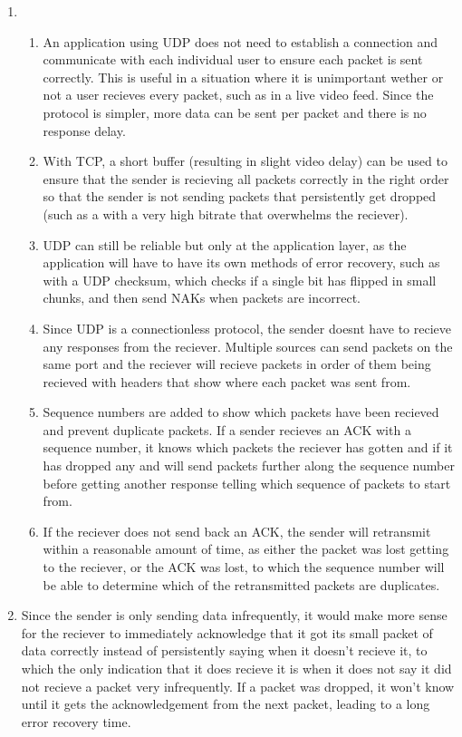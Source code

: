 \documentclass[12pt]{article}
\begin{document}
\begin{enumerate}
	\item \begin{enumerate}
			\item An application using UDP does not need to establish a connection and communicate with each individual user to ensure each packet is sent correctly. This is useful in a situation where it is unimportant wether or not a user recieves every packet, such as in a live video feed. Since the protocol is simpler, more data can be sent per packet and there is no response delay.
			\\
			\item With TCP, a short buffer (resulting in slight video delay) can be used to ensure that the sender is recieving all packets correctly in the right order so that the sender is not sending packets that persistently get dropped (such as a with a very high bitrate that overwhelms the reciever).
			\item UDP can still be reliable but only at the application layer, as the application will have to have its own methods of error recovery, such as with a UDP checksum, which checks if a single bit has flipped in small chunks, and then send NAKs when packets are incorrect.
			\item Since UDP is a connectionless protocol, the sender doesnt have to recieve any responses from the reciever. Multiple sources can send packets on the same port and the reciever will recieve packets in order of them being recieved with headers that show where each packet was sent from.
			\item Sequence numbers are added to show which packets have been recieved and prevent duplicate packets. If a sender recieves an ACK with a sequence number, it knows which packets the reciever has gotten and if it has dropped any and will send packets further along the sequence number before getting another response telling which sequence of packets to start from.
			\item If the reciever does not send back an ACK, the sender will retransmit within a reasonable amount of time, as either the packet was lost getting to the reciever, or the ACK was lost, to which the sequence number will be able to determine which of the retransmitted packets are duplicates.
		\end{enumerate}

	\item Since the sender is only sending data infrequently, it would make more sense for the reciever to immediately acknowledge that it got its small packet of data correctly instead of persistently saying when it doesn't recieve it, to which the only indication that it does recieve it is when it does not say it did not recieve a packet very infrequently. If a packet was dropped, it won't know until it gets the acknowledgement from the next packet, leading to a long error recovery time.



\end{enumerate}
\end{document}
